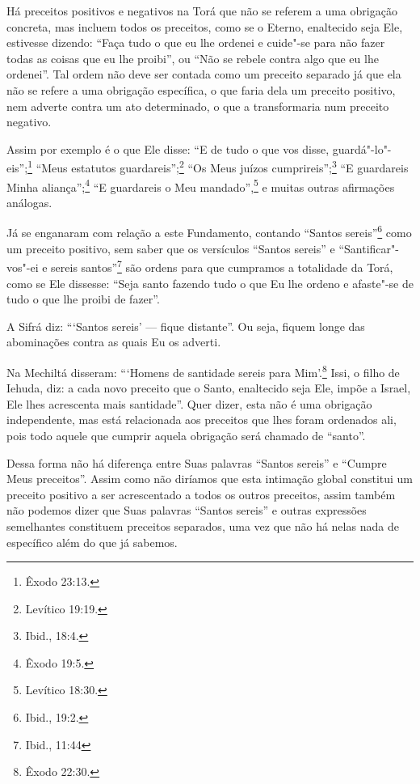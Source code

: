 \smallskip

Há preceitos positivos e negativos na Torá\starr{} que não se referem a uma
obrigação concreta, mas incluem todos os preceitos, como se o Eterno,
enaltecido seja Ele, estivesse dizendo: ``Faça tudo o que eu lhe ordenei
e cuide"-se para não fazer todas as coisas que eu lhe proibi'', ou ``Não
se rebele contra algo que eu lhe ordenei''. Tal ordem não deve ser
contada como um preceito separado já que ela não se refere a uma
obrigação específica, o que faria dela um preceito positivo, nem adverte
contra um ato determinado, o que a transformaria num preceito negativo.

Assim por exemplo é o que Ele disse: ``E de tudo o que vos disse,
guardá"-lo"-eis'';\footnote{Êxodo 23:13.} ``Meus estatutos guardareis'';\footnote{Levítico
19:19.} ``Os Meus juízos cumprireis'';\footnote{Ibid., 18:4.} ``E guardareis
Minha aliança'';\footnote{Êxodo 19:5.} ``E guardareis o Meu mandado'',\footnote{Levítico
18:30.} e muitas outras afirmações análogas.

Já se enganaram com relação a este Fundamento, contando ``Santos
sereis''\footnote{Ibid., 19:2.} como um preceito positivo, sem saber que os
versículos
``Santos sereis'' e ``Santificar"-vos"-ei e sereis santos''\footnote{Ibid., 11:44}
são ordens para que cumpramos a totalidade da Torá\starr, como se Ele
dissesse: ``Seja santo fazendo tudo o que Eu lhe ordeno e afaste"-se de
tudo o que lhe proibi de fazer''.

A Sifrá\starr{} diz: ```Santos sereis' --- fique distante''. Ou seja, fiquem
longe das abominações contra as quais Eu os adverti.

Na Mechiltá\starr{} disseram: ```Homens de santidade sereis para Mim'.\footnote{Êxodo
22:30.} Issi\starr, o filho de Iehuda\starr, diz: a cada novo preceito que o Santo,
enaltecido seja Ele, impõe a Israel, Ele lhes acrescenta mais
santidade''. Quer dizer, esta não é uma obrigação independente, mas está
relacionada aos preceitos que lhes foram ordenados ali, pois todo aquele
que cumprir aquela obrigação será chamado de ``santo''.

Dessa forma não há diferença entre Suas palavras ``Santos sereis'' e
``Cumpre Meus preceitos''. Assim como não diríamos que esta intimação
global constitui um preceito positivo a ser acrescentado a todos os
outros preceitos, assim também não podemos dizer que Suas palavras
``Santos sereis'' e outras expressões semelhantes constituem preceitos
separados, uma vez que não há nelas nada de específico além do que já
sabemos.

